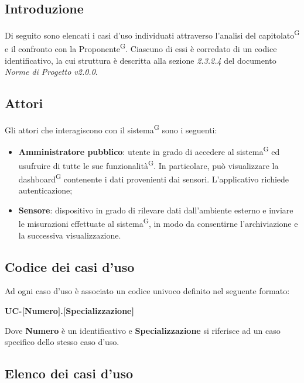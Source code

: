 \documentclass[8pt]{article}
\newcommand{\glossterm}[1]{#1\textsuperscript{G}} %
\begin{document}
\subsection{Introduzione}
Di seguito sono elencati i casi d'uso individuati attraverso l'analisi del \glossterm{capitolato} e il
confronto con la \glossterm{Proponente}. Ciascuno di essi è corredato di un codice identificativo, la cui
struttura è descritta alla sezione \textit{2.3.2.4} del documento \textit{Norme di Progetto v2.0.0}. %
\subsection{Attori}
Gli attori che interagiscono con il \glossterm{sistema} sono i seguenti:
\begin{itemize}
    \item \textbf{Amministratore pubblico}: utente in grado di accedere al \glossterm{sistema} ed usufruire di tutte le sue \glossterm{funzionalità}. In particolare, può visualizzare la \glossterm{dashboard} contenente i dati provenienti dai sensori. L'applicativo richiede autenticazione;
    \item \textbf{Sensore}: dispositivo in grado di rilevare dati dall'ambiente esterno e inviare le misurazioni effettuate al \glossterm{sistema}, in modo da consentirne l'archiviazione e la successiva visualizzazione.
\end{itemize}
\clearpage
\subsection{Codice dei casi d'uso}
Ad ogni caso d'uso è associato un codice univoco definito nel seguente formato:
\begin{center}
    \textbf{UC-[Numero].[Specializzazione]}
\end{center}
Dove \textbf{Numero} è un identificativo e \textbf{Specializzazione} si riferisce ad un caso specifico
dello stesso caso d'uso.
\subsection{Elenco dei casi d'uso}

\setcounter{uc}{-1}
\newcommand{\ucnumber}{\stepcounter{uc}\arabic{uc}}
\setcounter{specone}{0}
\newcommand{\speconenumber}{\stepcounter{specone}\arabic{specone}}
\setcounter{spectwo}{0}
\newcommand{\spectwonumber}{\stepcounter{spectwo}\arabic{spectwo}}
\end{document}
